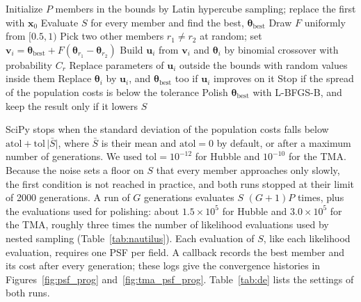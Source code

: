 \begin{algorithm}
\caption{Differential evolution with the best1bin strategy}\label{alg:de}
\begin{algorithmic}
\State Initialize $P$ members in the bounds by Latin hypercube sampling; replace the first with $\mathbf{x}_0$
\State Evaluate $S$ for every member and find the best, $\boldsymbol{\theta}_{\mathrm{best}}$
\State Draw $F$ uniformly from $[0.5,1)$
\State Pick two other members $r_1\neq r_2$ at random; set $\mathbf{v}_i=\boldsymbol{\theta}_{\mathrm{best}}+F(\boldsymbol{\theta}_{r_1}-\boldsymbol{\theta}_{r_2})$
\State Build $\mathbf{u}_i$ from $\mathbf{v}_i$ and $\boldsymbol{\theta}_i$ by binomial crossover with probability $C_r$
\State Replace parameters of $\mathbf{u}_i$ outside the bounds with random values inside them
\State Replace $\boldsymbol{\theta}_i$ by $\mathbf{u}_i$, and $\boldsymbol{\theta}_{\mathrm{best}}$ too if $\mathbf{u}_i$ improves on it
\EndIf
\EndFor
\State Stop if the spread of the population costs is below the tolerance
\EndFor
\State Polish $\boldsymbol{\theta}_{\mathrm{best}}$ with L-BFGS-B, and keep the result only if it lowers $S$
\end{algorithmic}
\end{algorithm}

SciPy stops when the standard deviation of the population costs falls below $\mathrm{atol}+\mathrm{tol}\,\lvert\bar{S}\rvert$, where $\bar{S}$ is their mean and $\mathrm{atol}=0$ by default, or after a maximum number of generations. We used $\mathrm{tol}=10^{-12}$ for Hubble and $10^{-10}$ for the TMA. Because the noise sets a floor on $S$ that every member approaches only slowly, the first condition is not reached in practice, and both runs stopped at their limit of 2000 generations. A run of $G$ generations evaluates $S$ $(G+1)P$ times, plus the evaluations used for polishing: about $1.5\times10^5$ for Hubble and $3.0\times10^5$ for the TMA, roughly three times the number of likelihood evaluations used by nested sampling (Table~\ref{tab:nautilus}). Each evaluation of $S$, like each likelihood evaluation, requires one PSF per field. A callback records the best member and its cost after every generation; these logs give the convergence histories in Figures~\ref{fig:psf_prog} and~\ref{fig:tma_psf_prog}. Table~\ref{tab:de} lists the settings of both runs.


